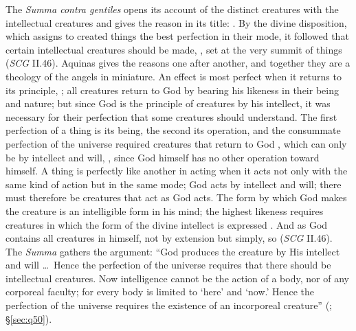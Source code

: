 The \emph{Summa contra gentiles} opens its account of the distinct creatures
with the intellectual creatures and gives the reason in its title:
. By the divine disposition, which assigns to created
things the best perfection in their mode, it followed that certain
intellectual creatures should be made, , set at the very summit of things (\emph{SCG} II.46). Aquinas
gives the reasons one after another, and together they are a theology of the
angels in miniature. An effect is most perfect when it returns to its
principle, ; all creatures return to God by
bearing his likeness in their being and nature; but since God is the
principle of creatures by his intellect, it was necessary for their
perfection that some creatures should understand. The first perfection of a
thing is its being, the second its operation, and the consummate perfection
of the universe required creatures that return to God , which can only
be by intellect and will, , since God himself has no other operation toward
himself. A thing is perfectly like another in acting when it acts not only
with the same kind of action but in the same mode; God acts by intellect and
will; there must therefore be creatures that act as God acts. The form by
which God makes the creature is an intelligible form in his mind; the
highest likeness requires creatures in which the form of the divine
intellect is expressed . And as God
contains all creatures in himself, not by extension but simply, so
 (\emph{SCG} II.46). The \emph{Summa} gathers the argument:
``God produces the creature by His intellect and will
\dots\ Hence the perfection of the universe requires that there should be
intellectual creatures. Now intelligence cannot be the action of a body, nor
of any corporeal faculty; for every body is limited to `here' and `now.'
Hence the perfection of the universe requires the existence of an incorporeal
creature'' (; \S\ref{sec:q50}).

